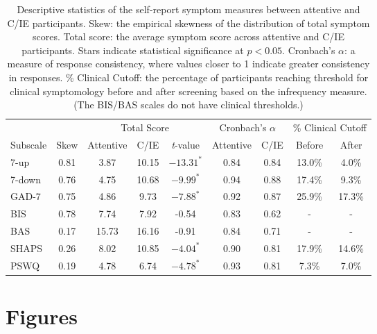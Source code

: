\documentclass[a4paper,notitlepage,12pt]{article}
\begin{document}
\begin{refsection}[main]
\clearpage
\begin{table}[h]
    \centering
    \small
    \setlength{\tabcolsep}{6pt}
    \begin{tabular}{lcccccccc}
        \toprule
        & & \multicolumn{3}{c}{Total Score} & \multicolumn{2}{c}{Cronbach's $\alpha$} & \multicolumn{2}{c}{\% Clinical Cutoff} \\
        \cmidrule(lr){3-5} \cmidrule(lr){6-7} \cmidrule(lr){8-9}
         Subscale & Skew & Attentive & C/IE & \textit{t}-value & Attentive & C/IE & Before & After \\
        \midrule
        7-up   &  0.81 &    3.87 &   10.15 &  $-13.31^*$ &    0.84 &    0.84 &     13.0\% &       4.0\% \\
        7-down &  0.76 &    4.75 &   10.68 &   $-9.99^*$ &    0.94 &    0.88 &     17.4\% &       9.3\% \\
        GAD-7  &  0.75 &    4.86 &    9.73 &   $-7.88^*$ &    0.92 &    0.87 &     25.9\% &      17.3\% \\
        BIS    &  0.78 &    7.74 &    7.92 &   -0.54 &    0.83 &    0.62 &        - &             - \\
        BAS    &  0.17 &   15.73 &   16.16 &   -0.91 &    0.84 &    0.71 &        - &             - \\
        SHAPS  &  0.26 &    8.02 &   10.85 &   $-4.04^*$ &    0.90 &    0.81 &     17.9\% &      14.6\% \\
        PSWQ   &  0.19 &    4.78 &    6.74 &   $-4.78^*$ &    0.93 &    0.81 &      7.3\% &       7.0\% \\
        \bottomrule
    \end{tabular}
    \captionsetup{width=0.88\textwidth}
    \caption{Descriptive statistics of the self-report symptom measures between attentive and C/IE participants. Skew: the empirical skewness of the distribution of total symptom scores. Total score: the average symptom score across attentive and C/IE participants. Stars indicate statistical significance at $p<0.05$. Cronbach's $\alpha$: a measure of response consistency, where values closer to 1 indicate greater consistency in responses. \% Clinical Cutoff: the percentage of participants reaching threshold for clinical symptomology before and after screening based on the infrequency measure. (The BIS/BAS scales do not have clinical thresholds.)}
    \label{tab:validation}
\end{table}

\clearpage
\section*{Figures}


\end{refsection}
\end{document}

